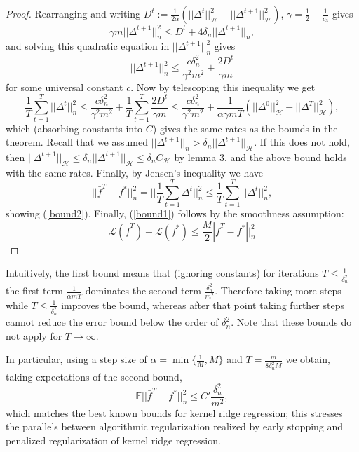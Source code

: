 \begin{proof}
Rearranging and writing $D^t := \frac{1}{2\alpha}(||\Delta^t||_{\mathcal{H}}^2 - ||\Delta^{t+1}||_{\mathcal{H}}^2)$, $\gamma = \frac{1}{2} - \frac{1}{c_3}$ gives
\begin{equation*}
\gamma m ||\Delta^{t+1}||_n^2 \le D^t + 4\delta_n||\Delta^{t+1}||_n,
\end{equation*}
and solving this quadratic equation in $||\Delta^{t+1}||_n^2$ gives
\begin{equation*}
||\Delta^{t+1}||_n^2 \le \frac{c\delta_n^2}{\gamma^2m^2} + \frac{2D^t}{\gamma m}
\end{equation*}
for some universal constant $c$. Now by telescoping this inequality we get
\begin{equation*}
\frac{1}{T}\sum_{t=1}^T||\Delta^t||_n^2 \le \frac{c\delta_n^2}{\gamma^2 m^2} + \frac{1}{T}\sum_{t=1}^T \frac{2D^t}{\gamma m} \le \frac{c\delta_n^2}{\gamma^2 m^2} + \frac{1}{\alpha\gamma m T}(||\Delta^0||_{\mathcal{H}}^2 - ||\Delta^T||_{\mathcal{H}}^2),
\end{equation*}
which (absorbing constants into $C$) gives the same rates as the bounds in the theorem. Recall that we assumed $||\Delta^{t+1}||_n > \delta_n ||\Delta^{t+1}||_{\mathcal{H}}$. If this does not hold, then $||\Delta^{t+1}||_{\mathcal{H}}\le \delta_n ||\Delta^{t+1}||_{\mathcal{H}} \le \delta_n C_{\mathcal{H}}$ by lemma 3, and the above bound holds with the same rates. Finally, by Jensen's inequality we have
\begin{equation*}
||\bar{f}^T - f^*||_n^2 = ||\frac{1}{T}\sum_{t=1}^T \Delta^t||_n^2 \le \frac{1}{T}\sum_{t=1}^T||\Delta^t||_n^2,
\end{equation*}
showing (\ref{bound2}). Finally, (\ref{bound1}) follows by the smoothness assumption:
\begin{equation*}
\mathcal{L}(\bar{f}^T) - \mathcal{L}(f^*) \le \frac{M}{2}|\bar{f}^T - f^*||_n^2
\end{equation*}
\end{proof}
\begin{remark}
Intuitively, the first bound means that (ignoring constants) for iterations $T\le \frac{1}{\delta_n^2}$ the first term $\frac{1}{\alpha m T}$ dominates the second term $\frac{\delta_n^2}{m^2}$. Therefore taking more steps while $T\le \frac{1}{\delta_n^2}$ improves the bound, whereas after that point taking further steps cannot reduce the error bound below the order of $\delta_n^2$. Note that these bounds do not apply for $T\rightarrow \infty$.

In particular, using a step size of $\alpha=\min\{\frac{1}{M}, M\}$ and $T=\frac{m}{8\delta_n^2M}$ we obtain, taking expectations of the second bound,
\begin{equation}
\mathbb{E}||\bar{f}^T-f^*||_n^2 \le C' \frac{\delta_n^2}{m^2},
\end{equation}
which matches the best known bounds for kernel ridge regression; this stresses the parallels between algorithmic regularization realized by early stopping and penalized regularization of kernel ridge regression.
\end{remark}


